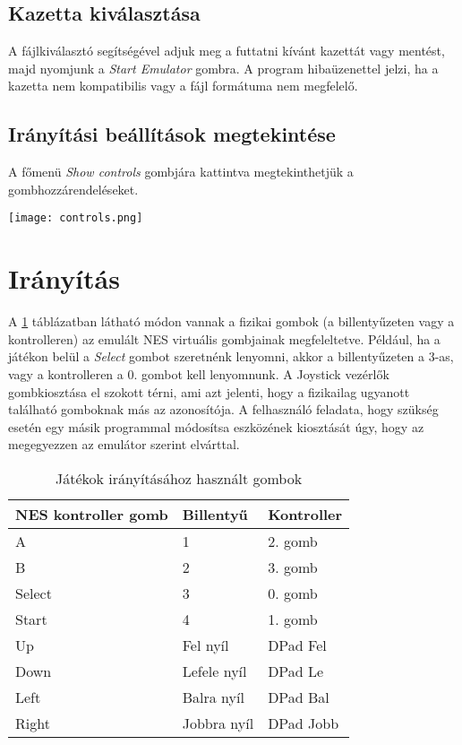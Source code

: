\subsection{Kazetta kiválasztása}

A fájlkiválasztó segítségével adjuk meg a futtatni kívánt kazettát vagy mentést, majd nyomjunk a \emph{Start Emulator} gombra.
A program hibaüzenettel jelzi, ha a kazetta nem kompatibilis vagy a fájl formátuma nem megfelelő.

\subsection{Irányítási beállítások megtekintése}

A főmenü \emph{Show controls} gombjára kattintva megtekinthetjük a gombhozzárendeléseket.

\begin{center}
	\texttt{[image: controls.png]}
\end{center}


\section {Irányítás}

A \ref{fig:btns} táblázatban látható módon vannak a fizikai gombok (a billentyűzeten vagy a kontrolleren) az emulált NES virtuális gombjainak megfeleltetve. Például, ha a játékon belül a \emph{Select} gombot szeretnénk lenyomni, akkor a billentyűzeten a 3-as, vagy a kontrolleren a 0. gombot kell lenyomnunk.
A Joystick vezérlők gombkiosztása el szokott térni, ami azt jelenti, hogy a fizikailag ugyanott található gomboknak más az azonosítója. A felhasználó feladata, hogy szükség esetén egy másik programmal módosítsa eszközének kiosztását úgy, hogy az megegyezzen az emulátor szerint elvárttal.

\begin{table}[H]
	\centering
	\begin{tabular}{ | l |  l | l | }
		\hline
		NES kontroller gomb & Billentyű & Kontroller \\
		\hline			
		A      & 1 & 2. gomb \\
		B      & 2 & 3. gomb \\
		Select & 3 & 0. gomb \\
		Start  & 4 & 1. gomb \\
		Up     & Fel nyíl & DPad Fel \\
		Down   & Lefele nyíl & DPad Le \\
		Left   & Balra nyíl & DPad Bal \\ 
		Right  & Jobbra nyíl & DPad Jobb \\
		\hline
	\end{tabular}
	\caption{Játékok irányításához használt gombok}
	\label{fig:btns}
\end{table}

